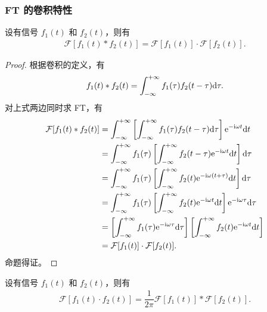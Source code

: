 \subsubsection{FT 的卷积特性}

\begin{theorem}[时域卷积定理]
    设有信号 $f_1(t)$ 和 $f_2(t)$，则有
    \begin{align*}
        \mathcal{F}[f_1(t) * f_2(t)] = \mathcal{F}[f_1(t)] \cdot \mathcal{F}[f_2(t)].
    \end{align*}
\end{theorem}

\begin{proof}
    根据卷积的定义，有
    \begin{align*}
        f_1(t) * f_2(t) = \int_{-\infty}^{+\infty} f_1(\tau)f_2(t - \tau)\mathrm{d}\tau.
    \end{align*}
    对上式两边同时求 FT，有
    \begin{align*}
        \mathcal{F}[f_1(t) * f_2(t)] & = \int_{-\infty}^{+\infty} \left[\int_{-\infty}^{+\infty} f_1(\tau)f_2(t - \tau)\mathrm{d}\tau\right]\mathrm{e}^{-\mathrm{i}\omega t}\mathrm{d}t \\
        & = \int_{-\infty}^{+\infty} f_1(\tau)\left[\int_{-\infty}^{+\infty} f_2(t - \tau)\mathrm{e}^{-\mathrm{i}\omega t}\mathrm{d}t\right]\mathrm{d}\tau \\
        & = \int_{-\infty}^{+\infty} f_1(\tau)\left[\int_{-\infty}^{+\infty} f_2(t)\mathrm{e}^{-\mathrm{i}\omega(t + \tau)}\mathrm{d}t\right]\mathrm{d}\tau \\
        & = \int_{-\infty}^{+\infty} f_1(\tau)\left[\int_{-\infty}^{+\infty} f_2(t)\mathrm{e}^{-\mathrm{i}\omega t}\mathrm{d}t\right]\mathrm{e}^{-\mathrm{i}\omega\tau}\mathrm{d}\tau \\
        & = \left[\int_{-\infty}^{+\infty} f_1(\tau)\mathrm{e}^{-\mathrm{i}\omega\tau}\mathrm{d}\tau\right]\left[\int_{-\infty}^{+\infty} f_2(t)\mathrm{e}^{-\mathrm{i}\omega t}\mathrm{d}t\right] \\
        & = \mathcal{F}[f_1(t)] \cdot \mathcal{F}[f_2(t)].
    \end{align*}
    命题得证。
\end{proof}

\begin{theorem}[频域卷积定理]
    设有信号 $f_1(t)$ 和 $f_2(t)$，则有
    \begin{align*}
        \mathcal{F}[f_1(t) \cdot f_2(t)] = \dfrac{1}{2\pi}\mathcal{F}[f_1(t)] * \mathcal{F}[f_2(t)].
    \end{align*}
\end{theorem}

